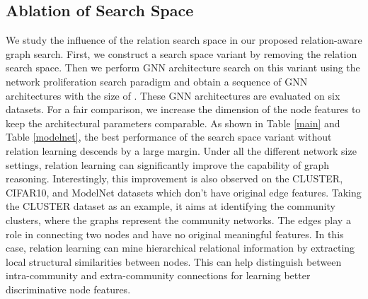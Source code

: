 \subsection{Ablation of Search Space}

We study the influence of the relation search space in our proposed relation-aware graph search. 
First, we construct a search space variant by removing the relation search space. 
Then we perform GNN architecture search on this variant using the network proliferation search paradigm and obtain a sequence of GNN architectures with the size of . 
These GNN architectures are evaluated on six datasets. 
For a fair comparison, we increase the dimension of the node features to keep the architectural parameters comparable. 
As shown in Table \ref{main} and Table \ref{modelnet}, the best performance of the search space variant without relation learning descends by a large margin. Under all the different network size settings, relation learning can significantly improve the capability of graph reasoning. 
Interestingly, this improvement is also observed on the CLUSTER, CIFAR10, and ModelNet datasets which don't have original edge features. 
Taking the CLUSTER dataset as an example, it aims at identifying the community clusters, where the graphs represent the community networks. 
The edges play a role in connecting two nodes and have no original meaningful features. 
In this case, relation learning can mine hierarchical relational information by extracting local structural similarities between nodes. 
This can help distinguish between intra-community and extra-community connections for learning better discriminative node features. 


